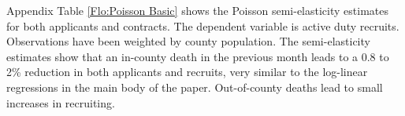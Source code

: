 \documentclass[12pt] {article}
\begin{document}
 




Appendix Table \ref{Flo:Poisson Basic} shows the Poisson semi-elasticity estimates for both applicants and contracts. The dependent variable is active duty recruits. Observations have been weighted by county population. The semi-elasticity estimates show that an in-county death in the previous month leads to a 0.8 to 2\% reduction in both applicants and recruits, very similar to the log-linear regressions in the main body of the paper. Out-of-county deaths lead to small increases in recruiting.
\end{document}
